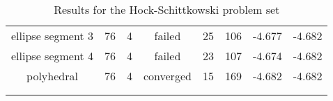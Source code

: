 \begin{footnotesize}
\begin{center}
\begin{longtable}{ c c c c c c c c }
    ellipse segment 3     &   76  &  4  &   failed   &   25  &  106  &   -4.677   &   -4.682   \\
    ellipse segment 4     &   76  &  4  &   failed   &   23  &  107  &   -4.674   &   -4.682   \\
        polyhedral        &   76  &  4  & converged  &   15  &  169  &   -4.682   &   -4.682   \\
\caption{Results for the Hock-Schittkowski problem set} \\
\label{linear_schittowski_results}
\end{longtable}
\end{center}
\end{footnotesize}
